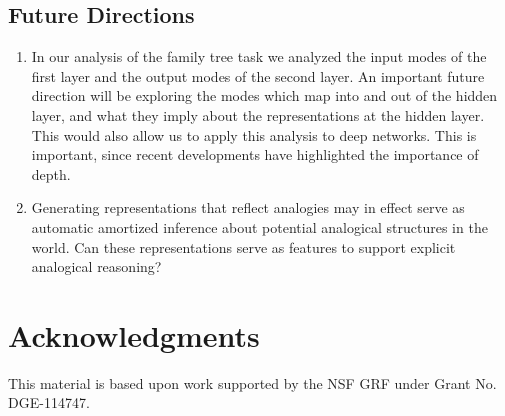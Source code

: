 \documentclass[10pt,letterpaper]{article}
\begin{document}
\subsection{Future Directions}
\begin{enumerate}
\itemsep0em
\item In our analysis of the family tree task we analyzed the input modes of the first layer and the output modes of the second layer. An important future direction will be exploring the modes which map into and out of the hidden layer, and what they imply about the representations at the hidden layer. This would also allow us to apply this analysis to deep networks. This is important, since recent developments have highlighted the importance of depth.
\item Generating representations that reflect analogies may in effect serve as automatic amortized inference about potential analogical structures in the world. Can these representations serve as features to support explicit analogical reasoning? 
\end{enumerate}
\section{Acknowledgments}
This material is based upon work supported by the NSF GRF under Grant No. DGE-114747.


\setlength{\bibleftmargin}{.125in}
\setlength{\bibindent}{-\bibleftmargin}


\end{document}
